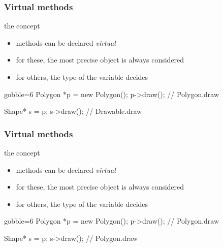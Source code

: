 \begin{frame}[fragile]
  \frametitle{Virtual methods}
  \begin{block}{the concept}
    \begin{itemize}
    \item methods can be declared {\it virtual}
    \item for these, the most precise object is always considered
    \item for others, the type of the variable decides
    \end{itemize}
  \end{block}
  \pause
  \begin{multicols}{2}
    \begin{cppcode*}{gobble=6}
      Polygon *p = new Polygon();
      p->draw(); // Polygon.draw
      
      Shape* s = p;
      s->draw(); // Drawable.draw
    \end{cppcode*}
    \columnbreak
    \center
  \end{multicols}    
\end{frame}

\begin{frame}[fragile]
  \frametitle{Virtual methods}
  \begin{block}{the concept}
    \begin{itemize}
    \item methods can be declared {\it virtual}
    \item for these, the most precise object is always considered
    \item for others, the type of the variable decides
    \end{itemize}
  \end{block}
  \begin{multicols}{2}
    \begin{cppcode*}{gobble=6}
      Polygon *p = new Polygon();
      p->draw(); // Polygon.draw
      
      Shape* s = p;
      s->draw();  // Polygon.draw
    \end{cppcode*}
    \columnbreak
    \center
  \end{multicols}    
\end{frame}

